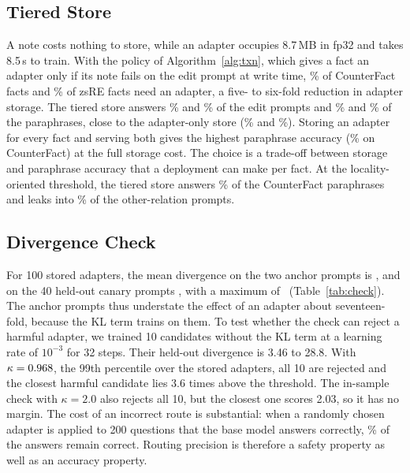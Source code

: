 \documentclass[journal,10pt]{IEEEtran}
\begin{document}
\subsection{Tiered Store}
\label{sec:tiered}

A note costs nothing to store, while an adapter occupies 8.7\,MB in fp32 and takes 8.5\,s
to train. With the policy of Algorithm~\ref{alg:txn}, which gives a fact an adapter only
if its note fails on the edit prompt at write time, \vCfTierFracPct\% of CounterFact facts
and \vZsTierFracPct\% of zsRE facts need an adapter, a five- to six-fold reduction in
adapter storage. The tiered store answers \vCfTierEffPct\% and \vZsTierEffPct\% of the edit
prompts and \vCfTierParaPct\% and \vZsTierParaPct\% of the paraphrases, close to the
adapter-only store (\vCfParaPct\% and \vZsParaPct\%). Storing an adapter for every fact
and serving both gives the highest paraphrase accuracy (\vCfParaBothPct\% on CounterFact)
at the full storage cost. The choice is a trade-off between storage and paraphrase
accuracy that a deployment can make per fact. At the locality-oriented threshold, the
tiered store answers \sCfParaTierPct\% of the CounterFact paraphrases and leaks into
\sCfEthreeLeakTieredPct\% of the other-relation prompts.

\subsection{Divergence Check}
\label{sec:check}



For 100 stored adapters, the mean divergence on the two anchor prompts is \chkInMean,
and on the 40 held-out canary prompts \chkHeldMean, with a maximum of \chkHeldMax\
(Table~\ref{tab:check}). The anchor prompts thus understate the effect of an adapter
about seventeen-fold, because the KL term trains on them. To test whether the check can
reject a harmful adapter, we trained 10 candidates without the KL term at a learning rate
of $10^{-3}$ for 32 steps. Their held-out divergence is 3.46 to 28.8. With
$\kappa=0.968$, the 99th percentile over the stored adapters, all 10 are rejected and
the closest harmful candidate lies 3.6 times above the threshold. The in-sample check
with $\kappa=2.0$ also rejects all 10, but the closest one scores 2.03, so it has no
margin. The cost of an incorrect route is substantial: when a randomly chosen adapter is
applied to 200 questions that the base model answers correctly, \chkWrongRoutePct\% of
the answers remain correct. Routing precision is therefore a safety property as well as
an accuracy property.
\end{document}
